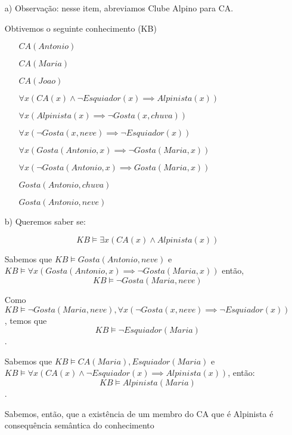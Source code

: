 \documentclass{article}
\begin{document}
\begin{enumerate}
    \begin{itemize}
        \item [a)] Observação: nesse item, abreviamos Clube Alpino para CA.
        
            Obtivemos o seguinte conhecimento (KB)

            \begin{itemize}
                \item [] $CA (Antonio)$
                \item [] $CA (Maria)$
                \item [] $CA (Joao)$
                \item [] $\forall x (CA(x) \land \neg Esquiador(x) \implies Alpinista(x))$
                \item [] $\forall x (Alpinista(x) \implies \neg Gosta (x, chuva))$
                \item [] $\forall x (\neg Gosta (x, neve) \implies \neg Esquiador (x))$
                \item [] $\forall x (Gosta (Antonio, x) \implies \neg Gosta (Maria, x))$
                \item [] $\forall x (\neg Gosta (Antonio, x) \implies Gosta (Maria, x))$
                \item [] $Gosta(Antonio, chuva)$
                \item [] $Gosta(Antonio, neve)$
            \end{itemize}
        
        \item [b)] Queremos saber se:
        
            $$KB \vDash \exists x (CA(x) \land Alpinista(x))$$

            Sabemos que $KB \vDash Gosta(Antonio, neve)$ e $KB \vDash \forall x (Gosta (Antonio, x) \implies \neg Gosta (Maria, x))$
            então, $$KB \vDash \neg Gosta(Maria, neve)$$

            Como $KB \vDash \neg Gosta(Maria, neve), \forall x (\neg Gosta (x, neve) \implies \neg Esquiador (x))$, temos que
            $$KB \vDash \neg Esquiador(Maria)$$.

            Sabemos que $KB \vDash CA (Maria), Esquiador(Maria)$ e $KB \vDash \forall x (CA(x) \land \neg Esquiador(x) \implies Alpinista(x))$,
            então: $$KB \vDash Alpinista(Maria)$$.

            Sabemos, então, que a existência de um membro do CA que é 
            Alpinista é consequência semântica do conhecimento


\end{itemize}
\end{enumerate}
\end{document}

